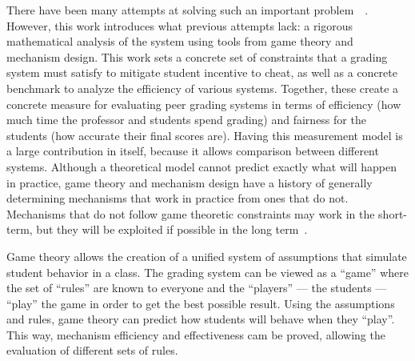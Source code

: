 \documentclass[12pt, Arial]{article}
\begin{document}
There have been many attempts at solving such an important problem~\cite{autograding}~\cite{edxsoftware}. However, this work introduces what previous attempts lack: a rigorous mathematical analysis of the system using tools from game theory and mechanism design. This work sets a concrete set of constraints that a grading system must satisfy to mitigate student incentive to cheat, as well as a concrete benchmark to analyze the efficiency of various systems. Together, these create a concrete measure for evaluating peer grading systems in terms of efficiency (how much time the professor and students spend grading) and fairness for the students (how accurate their final scores are). Having this measurement model is a large contribution in itself, because it allows comparison between different systems. Although a theoretical model cannot predict exactly what will happen in practice, game theory and mechanism design have a history of generally determining mechanisms that work in practice from ones that do not. Mechanisms that do not follow game theoretic constraints may work in the short-term, but they will be exploited if possible in the long term~\cite{boycottfinal}.

Game theory allows the creation of a unified system of assumptions that simulate student behavior in a class. The grading system can be viewed as a ``game'' where the set of ``rules'' are known to everyone and the ``players'' --- the students --- ``play'' the game in order to get the best possible result. Using the assumptions and rules, game theory can predict how students will behave when they ``play''. This way, mechanism efficiency and effectiveness cam be proved, allowing the evaluation of different sets of rules.
\end{document}
